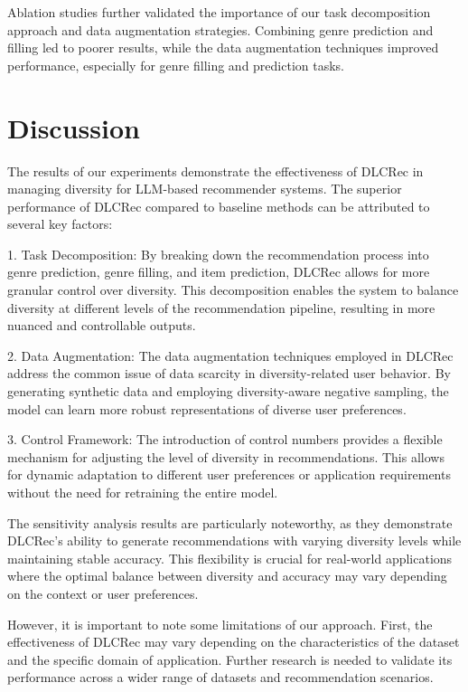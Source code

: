 \documentclass[12pt,letterpaper]{article}
\begin{document}
Ablation studies further validated the importance of our task decomposition approach and data augmentation strategies. Combining genre prediction and filling led to poorer results, while the data augmentation techniques improved performance, especially for genre filling and prediction tasks.

\section{Discussion}

The results of our experiments demonstrate the effectiveness of DLCRec in managing diversity for LLM-based recommender systems. The superior performance of DLCRec compared to baseline methods can be attributed to several key factors:

1. Task Decomposition: By breaking down the recommendation process into genre prediction, genre filling, and item prediction, DLCRec allows for more granular control over diversity. This decomposition enables the system to balance diversity at different levels of the recommendation pipeline, resulting in more nuanced and controllable outputs.

2. Data Augmentation: The data augmentation techniques employed in DLCRec address the common issue of data scarcity in diversity-related user behavior. By generating synthetic data and employing diversity-aware negative sampling, the model can learn more robust representations of diverse user preferences.

3. Control Framework: The introduction of control numbers provides a flexible mechanism for adjusting the level of diversity in recommendations. This allows for dynamic adaptation to different user preferences or application requirements without the need for retraining the entire model.

The sensitivity analysis results are particularly noteworthy, as they demonstrate DLCRec's ability to generate recommendations with varying diversity levels while maintaining stable accuracy. This flexibility is crucial for real-world applications where the optimal balance between diversity and accuracy may vary depending on the context or user preferences.

However, it is important to note some limitations of our approach. First, the effectiveness of DLCRec may vary depending on the characteristics of the dataset and the specific domain of application. Further research is needed to validate its performance across a wider range of datasets and recommendation scenarios.
\end{document}

